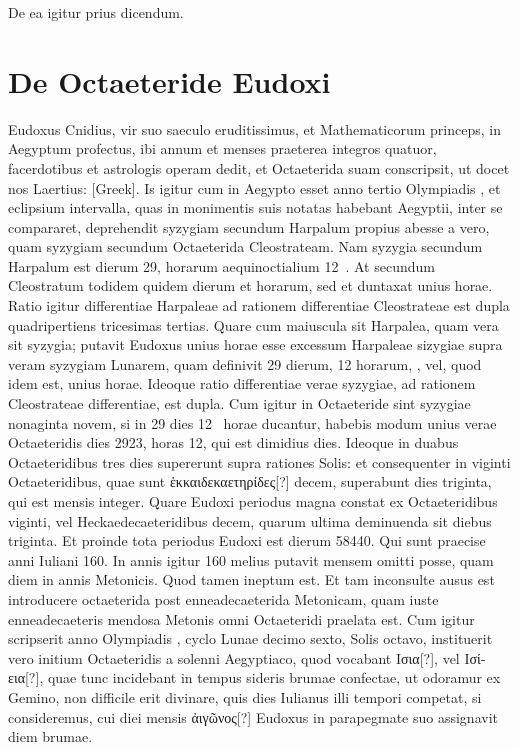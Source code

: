 De ea igitur prius dicendum.

\section{De Octaeteride Eudoxi}
Eudoxus Cnidius, vir suo saeculo eruditissimus, et Mathematicorum
princeps, in Aegyptum profectus, ibi annum et menses
praeterea integros quatuor, facerdotibus et astrologis operam dedit,
et Octaeterida suam conscripsit, ut docet nos Laertius: \textgreek{[Greek]}.
Is igitur cum in Aegypto
esset anno tertio Olympiadis , et eclipsium intervalla, quas in
monimentis suis notatas habebant Aegyptii, inter se compararet, deprehendit
syzygiam secundum Harpalum propius abesse a vero, quam
syzygiam secundum Octaeterida Cleostrateam.
Nam syzygia secundum
Harpalum est dierum 29, horarum aequinoctialium 12~.
At
secundum Cleostratum todidem quidem dierum et horarum, sed et 
duntaxat unius horae.
Ratio igitur differentiae Harpaleae ad rationem
differentiae Cleostrateae est dupla quadripertiens tricesimas tertias.
Quare cum maiuscula sit Harpalea, quam vera sit syzygia;
 putavit Eudoxus
 unius horae esse excessum Harpaleae sizygiae
 supra veram syzygiam
Lunarem, quam definivit 29 dierum, 12 horarum, , vel, quod
idem est,  unius horae.
Ideoque ratio differentiae verae syzygiae, ad rationem
Cleostrateae differentiae, est dupla.
Cum igitur in Octaeteride
sint syzygiae nonaginta novem, si in 29 dies 12~
 horae ducantur, habebis
modum unius verae Octaeteridis dies 2923, horas 12, qui est dimidius
dies.
Ideoque in duabus Octaeteridibus tres dies supererunt supra
rationes Solis: et consequenter in viginti Octaeteridibus, quae sunt
\textgreek{ἑκκαιδεκαετηρίδες[?]} decem, superabunt dies triginta,
 qui est mensis integer.
Quare Eudoxi periodus magna constat ex Octaeteridibus viginti,
vel Heckaedecaeteridibus decem, quarum ultima deminuenda sit
diebus triginta.
Et proinde tota periodus Eudoxi est dierum 58440.
Qui sunt praecise anni Iuliani 160.
In annis igitur 160 melius putavit
mensem omitti posse, quam diem in  annis Metonicis.
Quod tamen
ineptum est.
Et tam inconsulte ausus est introducere octaeterida
post enneadecaeterida Metonicam, quam iuste enneadecaeteris mendosa
Metonis omni Octaeteridi praelata est.
Cum igitur scripserit
anno  Olympiadis , cyclo Lunae decimo sexto,
 Solis octavo, instituerit
vero initium Octaeteridis a solenni Aegyptiaco, quod vocabant
\textgreek{Ισια[?]}, vel \textgreek{Ισίεια[?]}, quae tunc incidebant
 in tempus sideris brumae
confectae, ut odoramur ex Gemino, non difficile erit divinare, quis dies
Iulianus illi tempori competat, si consideremus, cui diei mensis
 \textgreek{ἀιγῶνος[?]}
Eudoxus in parapegmate suo assignavit diem brumae.

